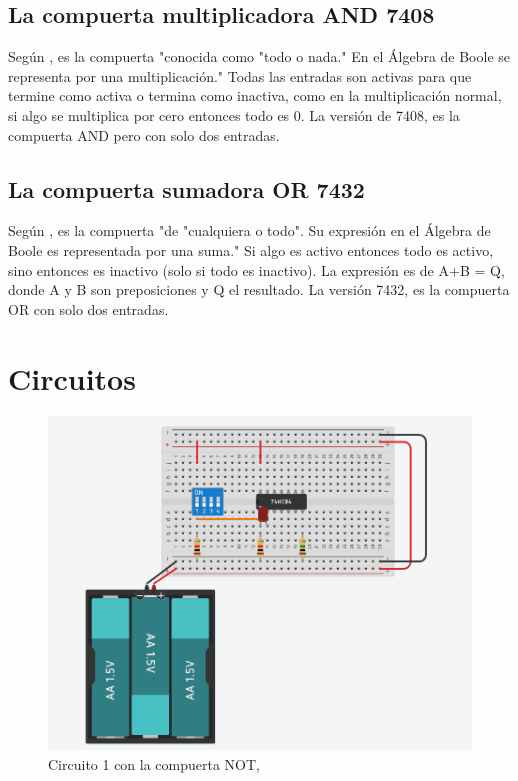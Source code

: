 \documentclass[stu, 12pt, letterpaper, donotrepeattitle, floatsintext, natbib, helv]{apa7}
\begin{document}
\subsection*{La compuerta multiplicadora AND 7408}
Según \cite{CompuertaLogicaAND}, es la compuerta "conocida como "todo o nada." En el Álgebra de Boole se representa por una multiplicación." Todas las entradas son activas para que termine como activa o termina como inactiva, como en la multiplicación normal, si algo se multiplica por cero entonces todo es 0. La versión de 7408, es la compuerta AND pero con solo dos entradas.

\subsection*{La compuerta sumadora OR 7432}
Según \cite{CompuertaLogicaOR}, es la compuerta "de "cualquiera o todo". Su expresión en el Álgebra de Boole es representada por una suma." Si algo es activo entonces todo es activo, sino entonces es inactivo (solo si todo es inactivo). La expresión es de A+B = Q, donde A y B son preposiciones y Q el resultado. La versión 7432, es la compuerta OR con solo dos entradas.
\section*{Circuitos}
{}

\begin{figure} [H]
    \centering
    \includegraphics[width=1\textwidth]{Circuito1.png}
    \caption{Circuito 1 con la compuerta NOT, \cite{circuits}}
    \label{fig:NOT}
\end{figure}
\end{document}
